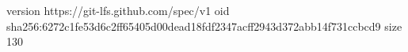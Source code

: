 version https://git-lfs.github.com/spec/v1
oid sha256:6272c1fe53d6c2ff65405d00dead18fdf2347acff2943d372abb14f731ccbcd9
size 130
